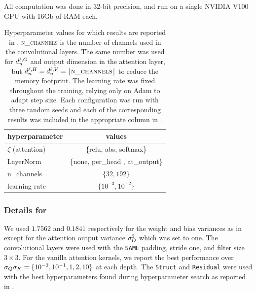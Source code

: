 All computation was done in 32-bit precision, and run on a single NVIDIA V100 GPU with 16Gb of RAM each.


\begin{table}[htbp]
\caption{Hyperparameter values for which results are reported in .
\textsc{n\_channels} is the number of channels used in the convolutional layers.
The same number was used for $d_{n}^{\ell, G}$ and output dimension in the attention layer, but $d_{n}^{\ell, H} = d_{n}^{\ell, V} = \lfloor\textsc{n\_channels}\rfloor$ to reduce the memory footprint.
The learning rate was fixed throughout the training, relying only on Adam to adapt step size.
Each configuration was run with three random seeds and each of the corresponding results was included in the appropriate column in .}
\label{tab:softmax_replacements_hypers}
\vskip 0.15in
\begin{center}
\begin{small}
\begin{sc}
\begin{tabular}{lc}
    \toprule
    hyperparameter & values \\
    \midrule
    $\zeta$ (attention) & \{relu, abs, softmax\} \\
    LayerNorm & \{none, per\_head , at\_output\} \\
    \midrule
    n\_channels   &  $\{ 32, 192 \}$  \\
    learning rate  &  $\{ 10^{-3}, 10^{-2} \}$ \\
    \bottomrule
\end{tabular}
\end{sc}
\end{small}
\end{center}
\vskip -0.18in
\end{table}




\subsubsection{Details for }\label{sect:depth_appendix}

We used $1.7562$ and $0.1841$ respectively for the weight and bias variances as in \citep[appendix G.1]{novak2019bayesian} except for the attention output variance $\sigma_{O}^2$ which was set to one.
The convolutional layers were used with the \texttt{SAME} padding, stride one, and filter size $3 \times 3$.
For the vanilla attention kernels, we report the best performance over $\sigma_{Q} \sigma_{K} = \{ 10^{-3}, 10^{-1}, 1, 2, 10 \}$ at each depth.
The \texttt{Struct} and \texttt{Residual} were used with the best hyperparameters found during hyperparameter search as reported in .

